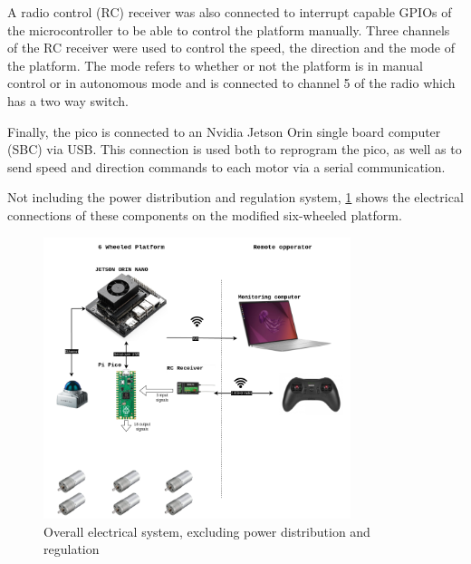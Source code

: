 \documentclass[11pt]{article}
\begin{document}
                A radio control (RC) receiver was also connected to interrupt capable GPIOs of the microcontroller to be able to control the platform manually. Three channels of the RC receiver were used to control the speed, the direction and the mode of the platform. The mode refers to whether or not the platform is in manual control or in autonomous mode and is connected to channel 5 of the radio which has a two way switch.

                Finally, the pico is connected to an Nvidia Jetson Orin single board computer (SBC) via USB. This connection is used both to reprogram the pico, as well as to send speed and direction commands to each motor via a serial communication. 

                Not including the power distribution and regulation system, \ref{fig:overall_electical_system} shows the electrical connections of these components on the modified six-wheeled platform.


                \begin{figure}[H]
                    \centering
                    
                    \includegraphics[width=0.8\textwidth]{Images/PFE-Page-2.drawio.png}
                    \caption{Overall electrical system, excluding power distribution and regulation}
                    \label{fig:overall_electical_system}
                \end{figure}
\end{document}
